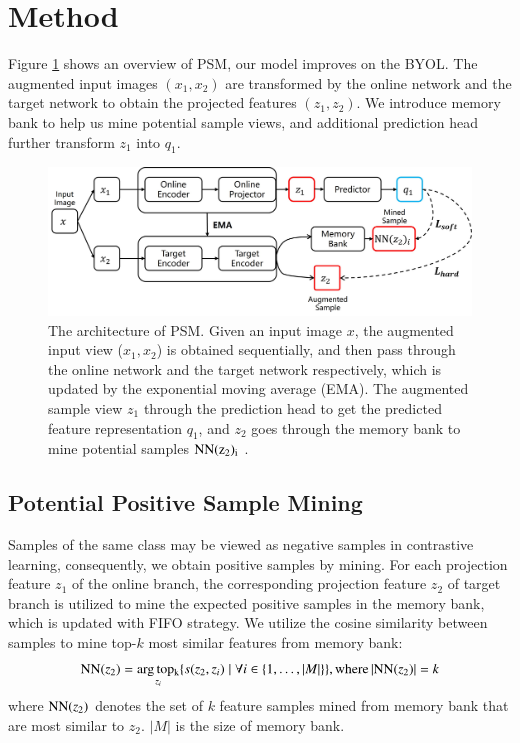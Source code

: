 \documentclass[review]{elsarticle}
\begin{document}
\section{Method}
Figure \ref{fig3} shows an overview of PSM, our model improves on the BYOL\cite{b6}. The augmented input images $(x_1, x_2)$ are transformed by the online network and the target network to obtain the projected features $(z_1, z_2)$. We introduce memory bank to help us mine potential sample views, and additional prediction head further transform $z_1$ into $q_1$.

\begin{figure}[!t]
\centering
\includegraphics[scale=0.45]{figure3.jpg}
\caption{The architecture of PSM. Given an input image $x$, the augmented input view ($x_1, x_2$) is obtained sequentially, and then pass through the online network and the target network respectively, which is updated by the exponential moving average (EMA).  The augmented sample view $z_1$ through the prediction head to get the predicted feature representation $q_1$, and $z_2$  goes through the memory bank to mine potential samples $\rm NN(z_2)_i$ . }
\label{fig3}
\end{figure}


\subsection{Potential Positive Sample Mining}
\label{chap4.1}
Samples of the same class may be viewed as negative samples in contrastive learning, consequently, we obtain positive samples by mining. For each projection feature $z_1$ of the online branch, the corresponding projection feature $z_2$ of target branch is utilized to mine the expected positive samples in the memory bank, which is updated with FIFO strategy. We utilize the cosine similarity between samples to mine top-$k$ most similar features from memory bank:
\begin{equation}
\begin{aligned}
 {\rm NN}(z_2)=\underset{z_i}{{\arg} \,  {\rm top_k}}\{s(z_2,z_i)\mid \forall i\in \{ 1,\dots   ,\left |M \right |\}   \},{\rm where}  \left | {\rm NN}(z_2)\right |=k    
     \label{equation3}
\end{aligned}
\end{equation}
where ${\rm NN}(z_2)$  denotes the set of $k$ feature samples mined from memory bank that are most similar to $z_2$. $\left |M \right |$ is the size of memory bank.
\end{document}
